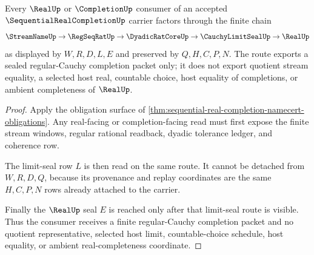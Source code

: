 \begin{theorem}
\label{thm:sequential-real-completion-cauchy-seal-route}
Every $\RealUp$ or $\CompletionUp$ consumer of an accepted $\SequentialRealCompletionUp$ carrier factors through the finite chain
$$
\StreamNameUp \to \RegSeqRatUp \to \DyadicRatCoreUp \to \CauchyLimitSealUp \to \RealUp
$$
as displayed by $W,R,D,L,E$ and preserved by $Q,H,C,P,N$. The route exports a sealed regular-Cauchy completion packet only; it does not export quotient stream equality, a selected host real, countable choice, host equality of completions, or ambient completeness of $\RealUp$.
\end{theorem}
\begin{proof}
Apply the obligation surface of \autoref{thm:sequential-real-completion-namecert-obligations}. Any real-facing or completion-facing read must first expose the finite stream windows, regular rational readback, dyadic tolerance ledger, and coherence row.

The limit-seal row $L$ is then read on the same route. It cannot be detached from $W,R,D,Q$, because its provenance and replay coordinates are the same $H,C,P,N$ rows already attached to the carrier.

Finally the $\RealUp$ seal $E$ is reached only after that limit-seal route is visible. Thus the consumer receives a finite regular-Cauchy completion packet and no quotient representative, selected host limit, countable-choice schedule, host equality, or ambient real-completeness coordinate.
\end{proof}




